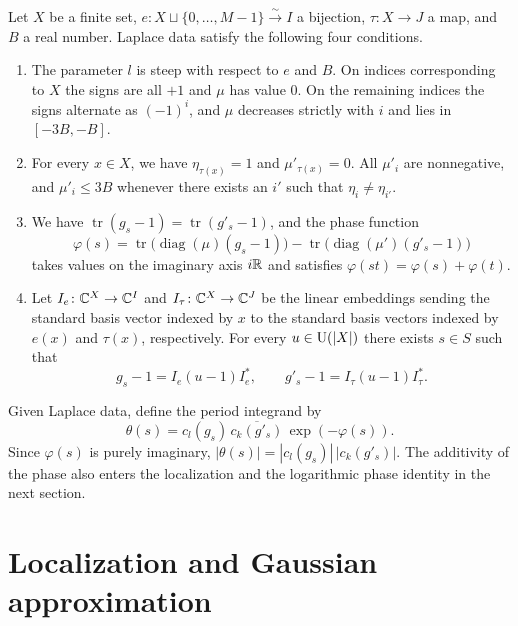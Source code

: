 \begin{definition}
\label{def:ch8-laplace-datum}
\emitthmsource
Let $X$ be a finite set, $e\colon X\sqcup\{0,\ldots,M-1\}\xrightarrow{\sim} I$ a bijection, $\tau\colon X\to J$ a map, and $B$ a real number. Laplace data satisfy the following four conditions.
\begin{enumerate}
\item The parameter $l$ is steep with respect to $e$ and $B$. On indices corresponding to $X$ the signs are all $+1$ and $\mu$ has value $0$. On the remaining indices the signs alternate as $(-1)^i$, and $\mu$ decreases strictly with $i$ and lies in $[-3B,-B]$.
\item For every $x\in X$, we have $\eta_{\tau(x)}=1$ and $\mu'_{\tau(x)}=0$. All $\mu'_i$ are nonnegative, and $\mu'_i\le 3B$ whenever there exists an $i'$ such that $\eta_i\ne\eta_{i'}$.
\item We have $\operatorname{tr}(g_s-1)=\operatorname{tr}(g'_s-1)$, and the phase function
\begin{equation}
\label{eq:ch8-phase}
\varphi(s)=\operatorname{tr}\bigl(\operatorname{diag}(\mu)(g_s-1)\bigr)
           -\operatorname{tr}\bigl(\operatorname{diag}(\mu')(g'_s-1)\bigr)
\end{equation}
takes values on the imaginary axis $i\mathbb{R}$ and satisfies $\varphi(st)=\varphi(s)+\varphi(t)$.
\item Let $I_e\colon\mathbb{C}^X\to\mathbb{C}^I$ and $I_\tau\colon\mathbb{C}^X\to\mathbb{C}^J$ be the linear embeddings sending the standard basis vector indexed by $x$ to the standard basis vectors indexed by $e(x)$ and $\tau(x)$, respectively. For every $u\in \operatorname{U}(|X|)$ there exists $s\in S$ such that
\[
 g_s-1=I_e(u-1)I_e^*,\qquad
 g'_s-1=I_\tau(u-1)I_\tau^* .
\]
\end{enumerate}
\end{definition}

Given Laplace data, define the period integrand by
\begin{equation}
\label{eq:ch8-integrand}
  \theta(s)=c_l(g_s)\,\overline{c_k(g'_s)}\,\exp(-\varphi(s)).
\end{equation}
Since $\varphi(s)$ is purely imaginary, $|\theta(s)|=|c_l(g_s)|\,|c_k(g'_s)|$. The additivity of the phase also enters the localization and the logarithmic phase identity in the next section.

\section{Localization and Gaussian approximation}
\label{sec:ch8-gaussian}

